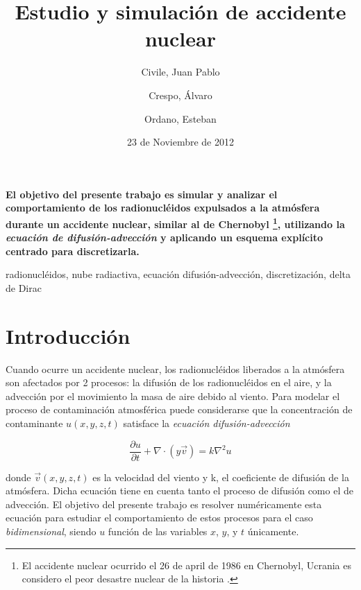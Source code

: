 \documentclass[twocolumn,a4paper,10pt]{article}
\title{Estudio y simulaci\'on de accidente nuclear}
\date{23 de Noviembre de 2012}
\author{Civile, Juan Pablo \and Crespo, Álvaro \and Ordano, Esteban }
\begin{document}
\pagestyle{fancy}
\maketitle
\thispagestyle{fancy}

\begin{customabstract}
\textbf{
El objetivo del presente trabajo es simular y analizar el comportamiento de los radionucl\'eidos expulsados a la atm\'osfera durante un accidente nuclear, similar al 
de Chernobyl \footnote{El accidente nuclear ocurrido el 26 de april de 1986 en Chernobyl, Ucrania es considero el peor desastre nuclear de la historia \cite{Chernobyl}.}, 
utilizando la \textit{ecuaci\'on de difusi\'on-advecci\'on} y aplicando un esquema expl\'icito centrado para discretizarla.
}
\end{customabstract}

\begin{keywords}
radionucl\'eidos, nube radiactiva,  ecuaci\'on difusi\'on-advecci\'on, discretizaci\'on, delta de Dirac
\end{keywords}

\section{Introducci\'on}

Cuando ocurre un accidente nuclear, los radionucl\'eidos liberados a la atm\'osfera son afectados por 2 procesos: la difusi\'on de los radionucl\'eidos en el aire, y
la advecci\'on por el movimiento la masa de aire debido al viento. Para modelar el proceso de contaminaci\'on atmosf\'erica puede considerarse que la concentraci\'on de
contaminante $u(x,y,z,t)$ satisface la \textit{ecuaci\'on difusi\'on-advecci\'on} \cite{Guia2-MNA} \cite{Convection-diffussion equation}

\begin{equation}
\label{ec:difusion-adveccion}
    \frac{\partial u}{\partial t} + \nabla \cdot (y \vec{v}) = k \nabla^2 u
\end{equation}

donde $\vec{v} (x,y,z,t)$ es la velocidad del viento  y k, el coeficiente de difusi\'on de la atm\'osfera. Dicha ecuaci\'on tiene en cuenta tanto el proceso de 
difusi\'on como el de advecci\'on. El objetivo del presente trabajo es resolver num\'ericamente esta ecuaci\'on para estudiar el comportamiento de estos procesos 
para el caso \textit{bidimensional}, siendo $u$ funci\'on de las variables $x$, $y$, y $t$ \'unicamente.
\end{document}

